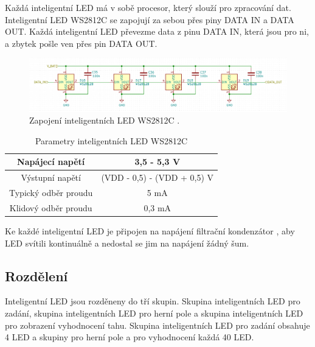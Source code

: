 Každá inteligentní LED má v sobě procesor, který slouží pro zpracování dat. 
Inteligentní LED WS2812C se zapojují za sebou přes piny DATA IN a DATA OUT. Každá inteligentní LED převezme data z pinu DATA IN, která jsou 
pro ni, a zbytek pošle ven přes pin DATA OUT.

\begin{figure}[!h]
    \begin{center}
      \includegraphics[scale=0.5]{obrazky/WS2812C_spojeni.png}
    \end{center}
    \caption[Zapojení inteligentních LED WS2812C]{Zapojení inteligentních LED WS2812C \cite{WS2812C_datasheet}.}
\end{figure}

\begin{table}[!h]
  \caption{Parametry inteligentních LED WS2812C \cite{WS2812C_datasheet}}
  \begin{center}
      \begin{tabular}{|c|c|}
          \hline
          Napájecí napětí   & 3,5 - 5,3 V \\
          \hline
          Výstupní napětí   & (VDD - 0,5) - (VDD + 0,5) V \\
          \hline
          Typický odběr proudu & 5 mA \\
          \hline
          Klidový odběr proudu & 0,3 mA \\
          \hline
      \end{tabular}    
  \end{center}
\end{table}

Ke každé inteligentní LED je připojen na napájení filtrační kondenzátor \cite{WS2812C_datasheet}, aby LED svítili kontinuálně 
a nedostal se jim na napájení žádný šum.

\subsection{Rozdělení}
Inteligentní LED jsou rozděneny do tří skupin. Skupina inteligentních LED pro zadání, skupina inteligentních LED pro herní pole 
a skupina inteligentních LED pro zobrazení vyhodnocení tahu.
Skupina inteligentních LED pro zadání obsahuje 4 LED a skupiny pro herní pole a pro vyhodnocení každá 40 LED.

